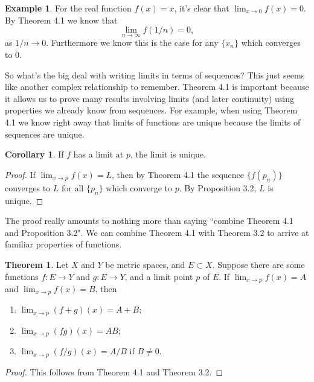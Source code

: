 \documentclass{article}
\theoremstyle{definition}
\newtheorem{theorem}{Theorem}[section]
\newtheorem{corollary}{Corollary}[section]
\newtheorem{example}{Example}[section]
\begin{document}
	\begin{example}
		For the real function $ f(x)=x $, it's clear that $ \lim_{x\to 0}f(x)=0 $. By Theorem 4.1 we know that $$ \lim\limits_{n\to\infty}f(1/n)=0,$$ as $ 1/n\to0 $. Furthermore we know this is the case for any $ \{x_n\} $ which converges to $ 0 $.  
	\end{example}
	So what's the big deal with writing limits in terms of sequences? This just seems like another complex relationship to remember. Theorem 4.1 is important because it allows us to prove many results involving limits (and later continuity) using properties we already know from sequences. For example, when using Theorem 4.1 we  know right away that limits of functions are unique because the limits of sequences are unique. 
	\begin{corollary}
		If $ f $ has a limit at $ p $, the limit is unique.
	\end{corollary}
	\begin{proof}
		If $ \lim_{x\to p}f(x)=L $, then by Theorem 4.1 the sequence $ \{f(p_n)\} $ converges to $ L $ for all $ \{p_n\} $ which converge to $ p $. By Proposition 3.2, $ L $ is unique. 
	\end{proof}
	The proof really amounts to nothing more than saying ``combine Theorem 4.1 and Proposition 3.2". We can combine Theorem 4.1 with Theorem 3.2 to arrive at familiar properties of functions. 
	\begin{theorem}
		Let $ X $ and $ Y $ be metric spaces, and $ E\subset X $. Suppose there are some functions $ f:E\to Y $ and $ g:E\to Y $, and a limit point $ p $ of $ E $. If $ \lim_{x\to p}f(x)=A $ and $ \lim_{x\to p}f(x)=B $, then
		\begin{enumerate}
			\item $ \lim_{x\to p}(f+g)(x)=A+B $;
			\item $ \lim_{x\to p}(fg)(x)=AB $;
			\item $ \lim_{x\to p}(f/g)(x)=A/B $ if $ B\neq 0 $.
		\end{enumerate}
	\end{theorem}
	\begin{proof}
		This follows from Theorem 4.1 and Theorem 3.2.
	\end{proof}
\end{document}
